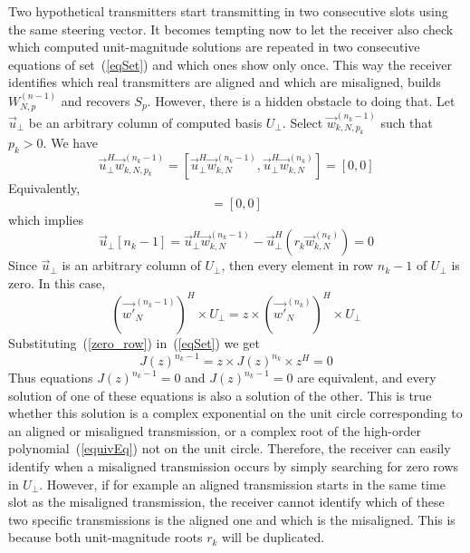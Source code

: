 \documentclass[10pt, a4paper, twocolumn]{IEEEtran}
\begin{document}
\noindent Two hypothetical transmitters start transmitting in two consecutive slots using the same steering vector. It becomes tempting now to let the receiver also check which computed unit-magnitude solutions are repeated in two consecutive equations of set~(\ref{eqSet}) and which ones show only once. This way the receiver identifies which real transmitters are aligned and which are misaligned, builds $W_{N,p}^{(n-1)}$ and recovers $S_p$. However, there is a hidden obstacle to doing that. Let $\overrightarrow{u}_{\bot}$ be an arbitrary column of computed basis $U_{\bot}$. Select $\overrightarrow{w}_{k,N,p_k}^{(n_k-1)}$ such that $p_k>0$. We have
\begin{equation}
\overrightarrow{u}_{\bot}^H\overrightarrow{w}_{k,N,p_k}^{(n_k-1)} = [\overrightarrow{u}_{\bot}^H\overrightarrow{w}_{k,N}^{(n_k-1)}, \overrightarrow{u}_{\bot}^H\overrightarrow{w}_{k,N}^{(n_k)}] = [0,0]
\end{equation}
\noindent Equivalently, 
\begin{equation}
[\overrightarrow{u}_{\bot}^H\overrightarrow{w}_{k,N}^{(n_k-1)}, \overrightarrow{u}_{\bot}^H(r_k\overrightarrow{w}_{k,N}^{(n_k)})] = [0,0]
\end{equation}
\noindent which implies
\begin{equation}
\label{break}
\overrightarrow{u}_{\bot}[n_k-1] = \overrightarrow{u}_{\bot}^H\overrightarrow{w}_{k,N}^{(n_k-1)} - \overrightarrow{u}_{\bot}^H(r_k\overrightarrow{w}_{k,N}^{(n_k)}) = 0
\end{equation}
\noindent Since $\overrightarrow{u}_{\bot}$ is an arbitrary column of $U_{\bot}$, then every element in row $n_k-1$ of $U_{\bot}$ is zero. In this case,
\begin{equation}
\label{zero_row}
(\overrightarrow{w'}_N^{(n_k-1)})^H\times U_{\bot} = z\times(\overrightarrow{w'}_N^{(n_k)})^H\times U_{\bot} 
\end{equation}
\noindent Substituting~(\ref{zero_row}) in~(\ref{eqSet}) we get
\begin{equation}
\label{equivEq}
J(z)^{n_k-1} = z\times J(z)^{n_k}\times z^H = 0
\end{equation}
\noindent Thus equations $J(z)^{n_k-1} = 0$ and $J(z)^{n_k-1} = 0$ are equivalent, and every solution of one of these equations is also a solution of the other. This is true whether this solution is a complex exponential on the unit circle corresponding to an aligned or misaligned transmission, or a complex root  of the high-order polynomial~(\ref{equivEq}) not on the unit circle. Therefore, the receiver can easily identify when a misaligned transmission occurs by simply searching for zero rows in $U_{\bot}$. However, if for example an aligned transmission starts in the same time slot as the misaligned transmission, the receiver cannot identify which of these two specific transmissions is the aligned one and which is the misaligned. This is because both unit-magnitude roots $r_k$ will be duplicated.\\
\end{document}
